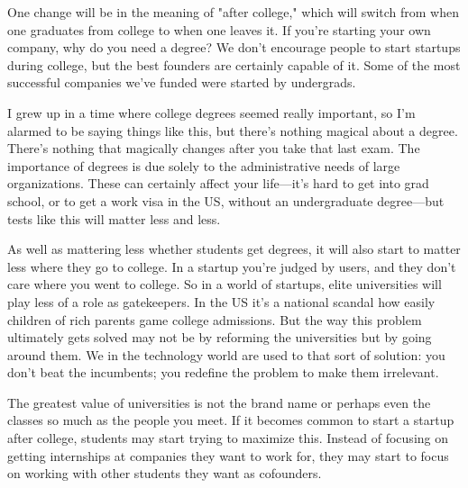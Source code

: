 One change will be in the
                    meaning of "after college," which will switch from when one
                    graduates from college to when one leaves it. If you're
                    starting your own company, why do you need a degree? We
                    don't encourage people to start startups during college, but
                    the best founders are certainly capable of it. Some of the
                    most successful companies we've funded were started by
                    undergrads.

I grew up in a time where college
                    degrees seemed really important, so I'm alarmed to be saying
                    things like this, but there's nothing magical about a
                    degree. There's nothing that magically changes after you
                    take that last exam. The importance of degrees is due solely
                    to the administrative needs of large organizations. These
                    can certainly affect your life---it's hard to get into
                    grad school, or to get a work visa in the US, without an
                    undergraduate degree---but tests like this will matter
                    less and less.

As well as mattering less whether
                    students get degrees, it will also start to matter less
                    where they go to college. In a startup you're judged by
                    users, and they don't care where you went to college. So in
                    a world of startups, elite universities will play less of a
                    role as gatekeepers. In the US it's a national scandal how
                    easily children of rich parents game college admissions. But
                    the way this problem ultimately gets solved may not be by
                    reforming the universities but by going around them. We in
                    the technology world are used to that sort of solution: you
                    don't beat the incumbents; you redefine the problem to make
                    them irrelevant.

The greatest value of
                    universities is not the brand name or perhaps even the
                    classes so much as the people you meet. If it becomes common
                    to start a startup after college, students may start trying
                    to maximize this. Instead of focusing on getting internships
                    at companies they want to work for, they may start to focus
                    on working with other students they want as cofounders.


